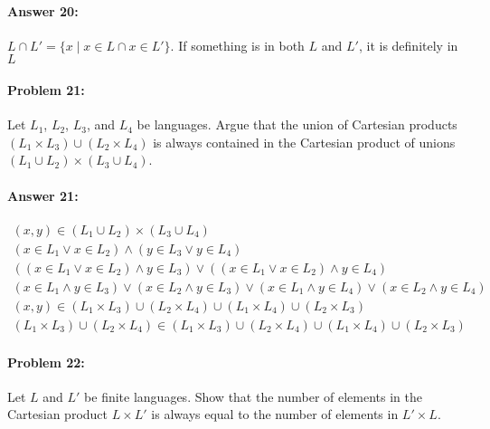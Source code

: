 \documentclass[12pt, letterpaper]{article}
\begin{document}
\paragraph{Answer 20:} $L \cap L' = \{x\mid x \in L \cap x \in L'\}$. If something is in both $L$ and $L'$, it is definitely in $L$

\hrulefill
\paragraph{Problem 21:}
Let $L_1$, $L_2$, $L_3$, and $L_4$ be languages. Argue that the union
of Cartesian products $(L_1 \times L_3) \cup (L_2 \times L_4)$ is
always contained in the Cartesian product of unions
$(L_1 \cup L_2) \times (L_3 \cup L_4)$.

\paragraph{Answer 21:} \begin{gather*}
    (x,y) \in (L_1 \cup L_2) \times (L_3 \cup L_4)\\
    (x \in L_1 \vee x \in L_2) \wedge (y \in L_3 \vee y \in L_4)\\
    ((x \in L_1 \vee x \in L_2) \wedge y \in L_3) \vee ((x \in L_1 \vee x \in L_2) \wedge y \in L_4)\\
    (x \in L_1 \wedge y \in L_3) \vee (x \in L_2 \wedge y \in L_3) \vee (x \in L_1 \wedge y \in L_4) \vee (x \in L_2 \wedge y \in L_4)\\
    (x,y) \in (L_1 \times L_3) \cup (L_2 \times L_4) \cup (L_1 \times L_4) \cup (L_2 \times L_3)\\
    (L_1 \times L_3) \cup (L_2 \times L_4) \in (L_1 \times L_3) \cup (L_2 \times L_4) \cup (L_1 \times L_4) \cup (L_2 \times L_3)
\end{gather*}

\hrulefill
\paragraph{Problem 22:}
Let $L$ and $L'$ be finite languages. Show that the number of elements
in the Cartesian product $L \times L'$ is always equal to the number
of elements in $L' \times L$.
\end{document}
